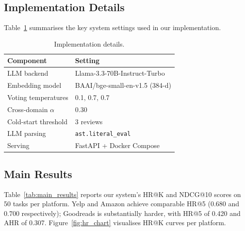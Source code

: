 \documentclass[11pt]{article}
\begin{document}
\subsection{Implementation Details}
Table~\ref{tab:impl} summarises the key system settings used in our implementation.

\begin{table}[H]
\centering
\begin{tabular}{l p{}}
\toprule
\textbf{Component} & \textbf{Setting} \\
\midrule
LLM backend            & Llama-3.3-70B-Instruct-Turbo \\
Embedding model        & BAAI/bge-small-en-v1.5 (384-d) \\
Voting temperatures    & 0.1, 0.7, 0.7 \\
Cross-domain $\alpha$  & 0.30 \\
Cold-start threshold   & 3 reviews \\
LLM parsing            & \texttt{ast.literal\_eval} \\
Serving                & FastAPI + Docker Compose \\
\bottomrule
\end{tabular}
\caption{Implementation details.}
\label{tab:impl}
\end{table}

\FloatBarrier

\subsection{Main Results}

Table~\ref{tab:main_results} reports our system's HR@K and NDCG@10 scores
on 50 tasks per platform.
Yelp and Amazon achieve comparable HR@5 (0.680 and 0.700 respectively);
Goodreads is substantially harder, with HR@5 of 0.420 and AHR of 0.307.
Figure~\ref{fig:hr_chart} visualises HR@K curves per platform.
\end{document}
